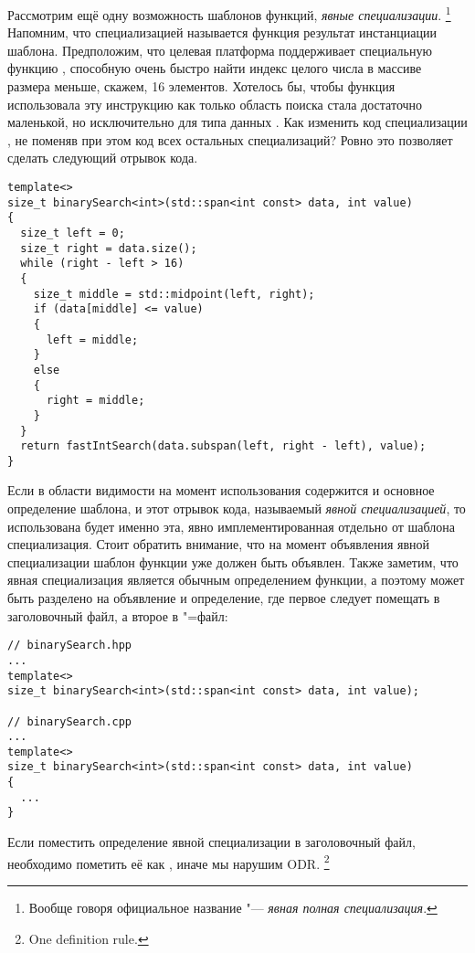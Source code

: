 Рассмотрим ещё одну возможность шаблонов функций, \textit{явные специализации}.
\footnote{Вообще говоря официальное название "--- \textit{явная полная специализация}.}
Напомним, что специализацией называется функция результат инстанциации шаблона.
Предположим, что целевая платформа поддерживает специальную функцию , способную очень быстро найти индекс целого числа в массиве размера меньше, скажем, 16 элементов.
Хотелось бы, чтобы функция  использовала эту инструкцию как только область поиска стала достаточно маленькой, но исключительно для типа данных .
Как изменить код специализации , не поменяв при этом код всех остальных специализаций? Ровно это позволяет сделать следующий отрывок кода.
\begin{verbatim}
template<>
size_t binarySearch<int>(std::span<int const> data, int value)
{
  size_t left = 0;
  size_t right = data.size();
  while (right - left > 16)
  {
    size_t middle = std::midpoint(left, right);
    if (data[middle] <= value)
    {
      left = middle;
    }
    else
    {
      right = middle;
    }
  }
  return fastIntSearch(data.subspan(left, right - left), value);
}
\end{verbatim}
Если в области видимости на момент использования  содержится и основное определение шаблона, и этот отрывок кода, называемый \textit{явной специализацией}, то использована будет именно эта, явно имплементированная отдельно от шаблона специализация.
Стоит обратить внимание, что на момент объявления явной специализации шаблон функции уже должен быть объявлен.
Также заметим, что явная специализация является обычным определением функции, а поэтому может быть разделено на объявление и определение, где первое следует помещать в заголовочный файл, а второе в "=файл:
\begin{verbatim}
// binarySearch.hpp
...
template<>
size_t binarySearch<int>(std::span<int const> data, int value);

// binarySearch.cpp
...
template<>
size_t binarySearch<int>(std::span<int const> data, int value)
{
  ...
}
\end{verbatim}
Если поместить определение явной специализации в заголовочный файл, необходимо пометить её как , иначе мы нарушим ODR.
\footnote{One definition rule.}

